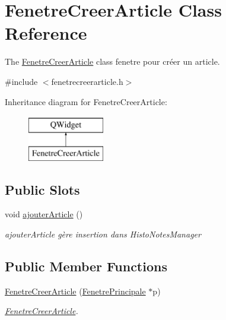 \hypertarget{class_fenetre_creer_article}{}\section{Fenetre\+Creer\+Article Class Reference}
\label{class_fenetre_creer_article}


The \hyperlink{class_fenetre_creer_article}{Fenetre\+Creer\+Article} class fenetre pour créer un article.  




{\ttfamily \#include $<$fenetrecreerarticle.\+h$>$}

Inheritance diagram for Fenetre\+Creer\+Article\+:\begin{figure}[H]
\begin{center}
\leavevmode
\includegraphics[height=2.000000cm]{class_fenetre_creer_article}
\end{center}
\end{figure}
\subsection*{Public Slots}
\begin{DoxyCompactItemize}
\item 
\mbox{\label{class_fenetre_creer_article_a1af9df05c8281484ded9773948c08eaa}} 
void \hyperlink{class_fenetre_creer_article_a1af9df05c8281484ded9773948c08eaa}{ajouter\+Article} ()
\begin{DoxyCompactList}\small\item\em ajouter\+Article gère insertion dans Histo\+Notes\+Manager \end{DoxyCompactList}\end{DoxyCompactItemize}
\subsection*{Public Member Functions}
\begin{DoxyCompactItemize}
\item 
\hyperlink{class_fenetre_creer_article_a42dc0e10146b018c2c77ceb9a6fda815}{Fenetre\+Creer\+Article} (\hyperlink{class_fenetre_principale}{Fenetre\+Principale} $\ast$p)
\begin{DoxyCompactList}\small\item\em \hyperlink{class_fenetre_creer_article}{Fenetre\+Creer\+Article}. \end{DoxyCompactList}\end{DoxyCompactItemize}


